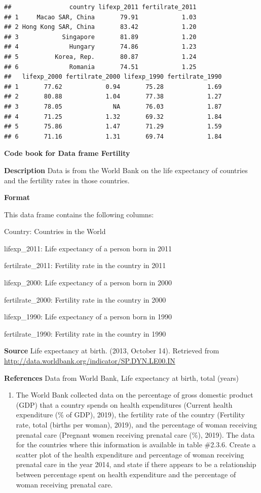 \documentclass[
]{book}
\providecommand{\tightlist}{%
  \setlength{\itemsep}{0pt}\setlength{\parskip}{0pt}}
\begin{document}
\begin{verbatim}
##                country lifexp_2011 fertilrate_2011
## 1     Macao SAR, China       79.91            1.03
## 2 Hong Kong SAR, China       83.42            1.20
## 3            Singapore       81.89            1.20
## 4              Hungary       74.86            1.23
## 5          Korea, Rep.       80.87            1.24
## 6              Romania       74.51            1.25
##   lifexp_2000 fertilrate_2000 lifexp_1990 fertilrate_1990
## 1       77.62            0.94       75.28            1.69
## 2       80.88            1.04       77.38            1.27
## 3       78.05              NA       76.03            1.87
## 4       71.25            1.32       69.32            1.84
## 5       75.86            1.47       71.29            1.59
## 6       71.16            1.31       69.74            1.84
\end{verbatim}

\textbf{Code book for Data frame Fertility}

\textbf{Description}
Data is from the World Bank on the life expectancy of countries and the fertility rates in those countries.

\textbf{Format}

This data frame contains the following columns:

Country: Countries in the World

lifexp\_2011: Life expectancy of a person born in 2011

fertilrate\_2011: Fertility rate in the country in 2011

lifexp\_2000: Life expectancy of a person born in 2000

fertilrate\_2000: Fertility rate in the country in 2000

lifexp\_1990: Life expectancy of a person born in 1990

fertilrate\_1990: Fertility rate in the country in 1990

\textbf{Source}
Life expectancy at birth. (2013, October 14). Retrieved from
\url{http://data.worldbank.org/indicator/SP.DYN.LE00.IN}

\textbf{References}
Data from World Bank, Life expectancy at birth, total (years)

\begin{enumerate}
\def\labelenumi{\arabic{enumi}.}
\setcounter{enumi}{3}
\tightlist
\item
  The World Bank collected data on the percentage of gross domestic product (GDP) that a country spends on health expenditures (Current health expenditure (\% of GDP), 2019), the fertility rate of the country (Fertility rate, total (births per woman), 2019), and the percentage of woman receiving prenatal care (Pregnant women receiving prenatal care (\%), 2019). The data for the countries where this information is available in table \#2.3.6. Create a scatter plot of the health expenditure and percentage of woman receiving prenatal care in the year 2014, and state if there appears to be a relationship between percentage spent on health expenditure and the percentage of woman receiving prenatal care.
\end{enumerate}
\end{document}
